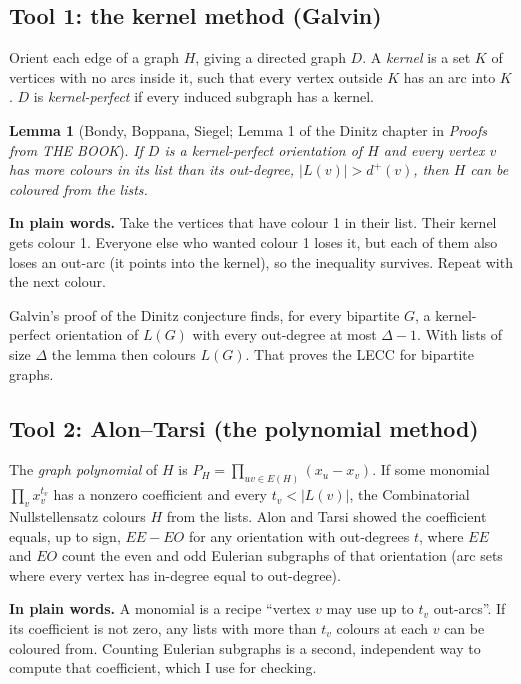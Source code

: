\documentclass[11pt]{article}
\theoremstyle{plain}
\newtheorem{lemma}[theorem]{Lemma}
\theoremstyle{definition}
\newcommand{\dout}{d^{+}}
\newcommand{\plain}[1]{\par\smallskip\noindent\colorbox{black!6}{\parbox{\dimexpr\linewidth-2\fboxsep}{\small\textbf{In plain words.} #1}}\par\smallskip}
\begin{document}
\subsection{Tool 1: the kernel method (Galvin)}

Orient each edge of a graph $H$, giving a directed graph $D$. A \emph{kernel} is a set $K$ of
vertices with no arcs inside it, such that every vertex outside $K$ has an arc into $K$. $D$ is
\emph{kernel-perfect} if every induced subgraph has a kernel.

\begin{lemma}[Bondy, Boppana, Siegel; Lemma 1 of the Dinitz chapter in \emph{Proofs from THE BOOK}]
If $D$ is a kernel-perfect orientation of $H$ and every vertex $v$ has more colours in its list
than its out-degree, $|L(v)| > \dout(v)$, then $H$ can be coloured from the lists.
\end{lemma}

\plain{Take the vertices that have colour 1 in their list. Their kernel gets colour 1. Everyone
else who wanted colour 1 loses it, but each of them also loses an out-arc (it points into the
kernel), so the inequality survives. Repeat with the next colour.}

Galvin's proof of the Dinitz conjecture finds, for every bipartite $G$, a kernel-perfect
orientation of $L(G)$ with every out-degree at most $\Delta - 1$. With lists of size $\Delta$
the lemma then colours $L(G)$. That proves the LECC for bipartite graphs.

\subsection{Tool 2: Alon--Tarsi (the polynomial method)}

The \emph{graph polynomial} of $H$ is $P_H = \prod_{uv \in E(H)} (x_u - x_v)$. If some monomial
$\prod_v x_v^{t_v}$ has a nonzero coefficient and every $t_v < |L(v)|$, the Combinatorial
Nullstellensatz colours $H$ from the lists. Alon and Tarsi showed the coefficient equals, up to
sign, $EE - EO$ for any orientation with out-degrees $t$, where $EE$ and $EO$ count the even
and odd Eulerian subgraphs of that orientation (arc sets where every vertex has in-degree
equal to out-degree).

\plain{A monomial is a recipe ``vertex $v$ may use up to $t_v$ out-arcs''. If its coefficient
is not zero, any lists with more than $t_v$ colours at each $v$ can be coloured from. Counting
Eulerian subgraphs is a second, independent way to compute that coefficient, which I use for
checking.}
\end{document}

